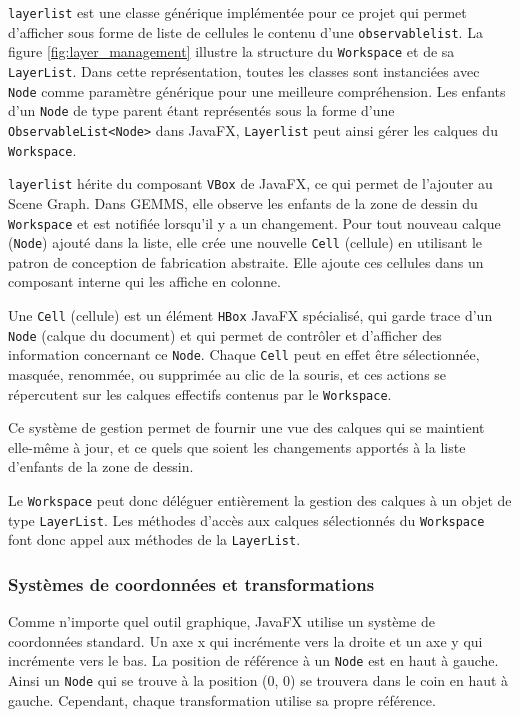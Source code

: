 \texttt{\gls{layerlist}} est une classe générique implémentée pour ce projet qui permet d'afficher sous forme de liste de cellules le contenu d'une \texttt{\gls{observablelist}}. La figure \ref{fig:layer_management} illustre la structure du \texttt{Workspace} et de sa \texttt{LayerList}. Dans cette représentation, toutes les classes sont instanciées avec \texttt{Node} comme paramètre générique pour une meilleure compréhension. Les enfants d'un \texttt{Node} de type parent étant représentés sous la forme d'une \texttt{ObservableList<Node>} dans JavaFX, \texttt{Layerlist} peut ainsi gérer les calques du \texttt{Workspace}.

\texttt{\gls{layerlist}} hérite du composant \texttt{VBox} de JavaFX, ce qui permet de l'ajouter au Scene Graph. Dans GEMMS, elle observe les enfants de la zone de dessin du \texttt{Workspace} et est notifiée lorsqu'il y a un changement. Pour tout nouveau calque (\texttt{Node}) ajouté dans la liste, elle crée une nouvelle \texttt{Cell} (cellule) en utilisant le patron de conception de fabrication abstraite. Elle ajoute ces cellules dans un composant interne qui les affiche en colonne.

Une \texttt{Cell} (cellule) est un élément \texttt{HBox} JavaFX spécialisé, qui garde trace d'un \texttt{Node} (calque du document) et qui permet de contrôler et d'afficher des information concernant ce \texttt{Node}. Chaque \texttt{Cell} peut en effet être sélectionnée, masquée, renommée, ou supprimée au clic de la souris, et ces actions se répercutent sur les calques effectifs contenus par le \texttt{Workspace}. 

Ce système de gestion permet de fournir une vue des calques qui se maintient elle-même à jour, et ce quels que soient les changements apportés à la liste d'enfants de la zone de dessin.

Le \texttt{Workspace} peut donc déléguer entièrement la gestion des calques à un objet de type \texttt{LayerList}. Les méthodes d'accès aux calques sélectionnés du \texttt{Workspace} font donc appel aux méthodes de la \texttt{LayerList}.



\subsubsection{Systèmes de coordonnées et transformations}
Comme n'importe quel outil graphique, JavaFX utilise un système de coordonnées standard. Un axe x qui incrémente vers la droite et un axe y qui incrémente vers le bas. La position de référence à un \texttt{Node} est en haut à gauche. Ainsi un \texttt{Node} qui se trouve à la position (0, 0) se trouvera dans le coin en haut à gauche. Cependant, chaque transformation utilise sa propre référence.

